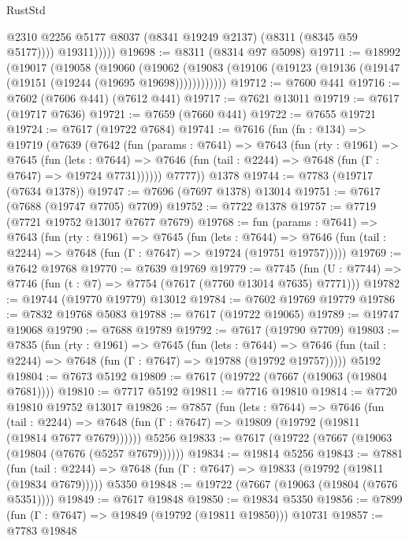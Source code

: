 \begin{lexlean}{RustStd}
\begin{coremodule}
                  @2310
                  @2256
                  @5177
                  @8037
                  (@8341 @19249 @2137)
                  (@8311 (@8345 @59 @5177))))
              @19311)))))
@19698 := @8311 (@8314 @97 @5098)
@19711 := @18992
    (@19017
      (@19058
        (@19060
          (@19062 (@19083 (@19106 (@19123 (@19136 (@19147 (@19151 (@19244 (@19695 @19698))))))))))))
@19712 := @7600 @441
@19716 := @7602 (@7606 @441) (@7612 @441)
@19717 := @7621 @13011
@19719 := @7617 (@19717 @7636)
@19721 := @7659 (@7660 @441)
@19722 := @7655 @19721
@19724 := @7617 (@19722 @7684)
@19741 := @7616
    (fun (fn : @134) =>
    @19719
      (@7639
        (@7642
          (fun (params : @7641) =>
          @7643
            (fun (rty : @1961) =>
            @7645
              (fun (lets : @7644) =>
              @7646 (fun (tail : @2244) => @7648 (fun (Γ : @7647) => @19724 @7731))))))
        @7777))
    @1378
@19744 := @7783 (@19717 (@7634 @1378))
@19747 := @7696 (@7697 @1378) @13014
@19751 := @7617 (@7688 (@19747 @7705) @7709)
@19752 := @7722 @1378
@19757 := @7719 (@7721 @19752 @13017 @7677 @7679)
@19768 := fun (params : @7641) =>
  @7643
    (fun (rty : @1961) =>
    @7645
      (fun (lets : @7644) =>
      @7646 (fun (tail : @2244) => @7648 (fun (Γ : @7647) => @19724 (@19751 @19757)))))
@19769 := @7642 @19768
@19770 := @7639 @19769
@19779 := @7745
    (fun (U : @7744) => @7746 (fun (t : @7) => @7754 (@7617 (@7760 @13014 @7635) @7771)))
@19782 := @19744 (@19770 @19779) @13012
@19784 := @7602 @19769 @19779
@19786 := @7832 @19768 @5083
@19788 := @7617 (@19722 @19065)
@19789 := @19747 @19068
@19790 := @7688 @19789
@19792 := @7617 (@19790 @7709)
@19803 := @7835
    (fun (rty : @1961) =>
    @7645
      (fun (lets : @7644) =>
      @7646 (fun (tail : @2244) => @7648 (fun (Γ : @7647) => @19788 (@19792 @19757)))))
    @5192
@19804 := @7673 @5192
@19809 := @7617 (@19722 (@7667 (@19063 (@19804 @7681))))
@19810 := @7717 @5192
@19811 := @7716 @19810
@19814 := @7720 @19810 @19752 @13017
@19826 := @7857
    (fun (lets : @7644) =>
    @7646
      (fun (tail : @2244) =>
      @7648 (fun (Γ : @7647) => @19809 (@19792 (@19811 (@19814 @7677 @7679))))))
    @5256
@19833 := @7617 (@19722 (@7667 (@19063 (@19804 (@7676 (@5257 @7679))))))
@19834 := @19814 @5256
@19843 := @7881
    (fun (tail : @2244) => @7648 (fun (Γ : @7647) => @19833 (@19792 (@19811 (@19834 @7679)))))
    @5350
@19848 := @19722 (@7667 (@19063 (@19804 (@7676 @5351))))
@19849 := @7617 @19848
@19850 := @19834 @5350
@19856 := @7899 (fun (Γ : @7647) => @19849 (@19792 (@19811 @19850))) @10731
@19857 := @7783 @19848

\end{coremodule}
\end{lexlean}
